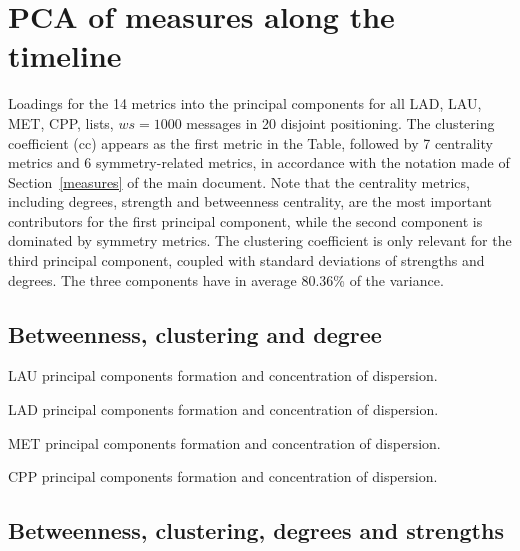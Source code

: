 \documentclass[%
 aip,
 jmp,%
 amsmath,amssymb,
 reprint,%
 floatfix,
]{revtex4-1}
\begin{document}
\FloatBarrier
\section{PCA of measures along the timeline}\label{sec:pcat}
Loadings for the 14 metrics into the principal components for all LAD, LAU, MET, CPP, lists, $ws=1000$ messages in 20 disjoint positioning. The clustering coefficient (cc) appears as the first metric in the Table, followed by 7 centrality metrics and 6 symmetry-related metrics, in accordance with the notation made of Section~\ref{measures} of the main document. Note that the centrality metrics, including degrees, strength and betweenness centrality, are the most important contributors for the first principal component, while the second component is dominated by symmetry metrics. The clustering coefficient is only relevant for the third principal component, coupled with standard deviations of strengths and degrees. The three components have in average 80.36\% of the variance.
\subsection{Betweenness, clustering and degree}

\begin{table}[!h]
	\caption{LAU principal components formation and concentration of dispersion.}
	\footnotesize
	
\label{tab:pcain}
\end{table}

\begin{table}[!h]
	\caption{LAD principal components formation and concentration of dispersion.}
	\footnotesize
	
\label{tab:pcain}
\end{table}

\begin{table}[!h]
	\caption{MET principal components formation and concentration of dispersion.}
	\footnotesize
	
\label{tab:pcain}
\end{table}

\begin{table}[!h]
	\caption{CPP principal components formation and concentration of dispersion.}
	\footnotesize
	
\label{tab:pcain}
\end{table}

\FloatBarrier
\subsection{Betweenness, clustering, degrees and strengths}
\end{document}
